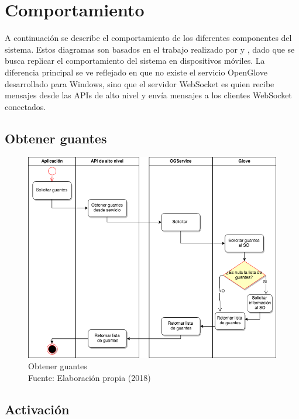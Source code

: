 \section{Comportamiento}
A continuación se describe el comportamiento de los diferentes componentes del sistema. Estos diagramas son basados en el trabajo realizado por \cite{tesis-meneses-sebastian} y \cite{tesis-cerda-rodrigo}, dado que se busca replicar el comportamiento del sistema en dispositivos móviles. La diferencia principal se ve reflejado en que no existe el servicio OpenGlove desarrollado para Windows, sino que el servidor WebSocket es quien recibe mensajes desde las APIs de alto nivel y envía mensajes a los clientes WebSocket conectados.

\subsection{Obtener guantes}

\begin{figure}[H]
  \begin{center} 
   	\includegraphics[width=1.0\textwidth]{images/chapter04/ActivityDiagrams-GetGloves.png} 
    \caption[Obtener guantes]{Obtener guantes \\Fuente: Elaboración propia (2018)}
    \label{fig:activity-diagrams01-GetGloves}
  \end{center}
\end{figure}

\subsection{Activación}

